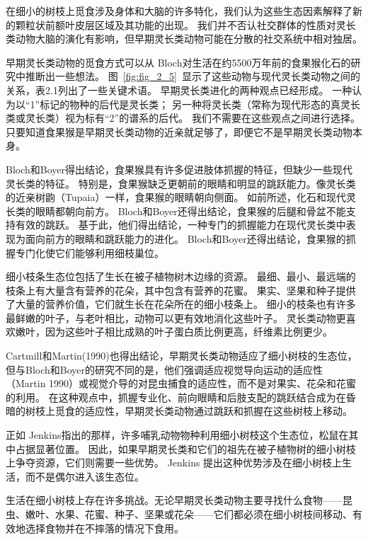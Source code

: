 在细小的树枝上觅食涉及身体和大脑的许多特化，我们认为这些生态因素解释了新的颗粒状前额叶皮层区域及其功能的出现。
我们并不否认社交群体的性质对灵长类动物大脑的演化有影响\cite{dunbar2009social}，但早期灵长类动物可能在分散的社交系统中相对独居\cite{mueller2000origin}。


早期灵长类动物的觅食方式可以从 Bloch\cite{bloch2002grasping}对生活在约5500万年前的食果猴化石的研究中推断出一些想法。
图~\ref{fig:fig_2_5}~显示了这些动物与现代灵长类动物之间的关系，表2.1列出了一些关键术语。
早期灵长类进化的两种观点已经形成。
一种认为以“1”标记的物种的后代是灵长类；
另一种将灵长类（常称为现代形态的真灵长类或灵长类）视为标有“2”的谱系的后代。
我们不需要在这些观点之间进行选择。只要知道食果猴是早期灵长类动物的近亲就足够了，即便它不是早期灵长类动物本身。


Bloch和Boyer得出结论，食果猴具有许多促进肢体抓握的特征，但缺少一些现代灵长类的特征。
特别是，食果猴缺乏更朝前的眼睛和明显的跳跃能力。像灵长类的近亲树鼩（Tupaia）一样，食果猴的眼睛朝向侧面。
如前所述，化石和现代灵长类的眼睛都朝向前方。
Bloch和Boyer还得出结论，食果猴的后腿和骨盆不能支持有效的跳跃。
基于此，他们得出结论，一种专门的抓握能力在现代灵长类中表现为面向前方的眼睛和跳跃能力的进化。
Bloch和Boyer还得出结论，食果猴的抓握专门化使它们能够利用细枝巢位。


细小枝条生态位包括了生长在被子植物树木边缘的资源。
最细、最小、最远端的枝条上有大量含有营养的花朵，其中包含有营养的花蜜。
果实、坚果和种子提供了大量的营养价值，它们就生长在花朵所在的细小枝条上。
细小的枝条也有许多最鲜嫩的叶子，与老叶相比，动物可以更有效地消化这些叶子。
灵长类动物更喜欢嫩叶，因为这些叶子相比成熟的叶子蛋白质比例更高，纤维素比例更少。


Cartmill\cite{cartmill1974rethinking}和Martin(1990)也得出结论，早期灵长类动物适应了细小树枝的生态位，但与Bloch和Boyer的研究不同的是，他们强调适应视觉导向运动的适应性（Martin 1990）或视觉介导的对昆虫捕食的适应性\cite{cartmill2017arboreal,bloch2002grasping}，而不是对果实、花朵和花蜜的利用\cite{sussman1991primate,bloch2002grasping}。
在这种观点中，抓握专业化、前向眼睛和后肢支配的跳跃结合成为在昏暗的树枝上觅食的适应性，早期灵长类动物通过跳跃和抓握在这些树枝上移动。


正如 Jenkins\cite{jenkins1974tree}指出的那样，许多哺乳动物物种利用细小树枝这个生态位，松鼠在其中占据显著位置。
因此，如果早期灵长类和它们的祖先在被子植物树的细小树枝上争夺资源，它们则需要一些优势。
Jenkins 提出这种优势涉及在细小树枝上生活，而不是偶尔进入该生态位。


生活在细小树枝上存在许多挑战。无论早期灵长类动物主要寻找什么食物——昆虫、嫩叶、水果、花蜜、种子、坚果或花朵——它们都必须在细小树枝间移动、有效地选择食物并在不摔落的情况下食用。


